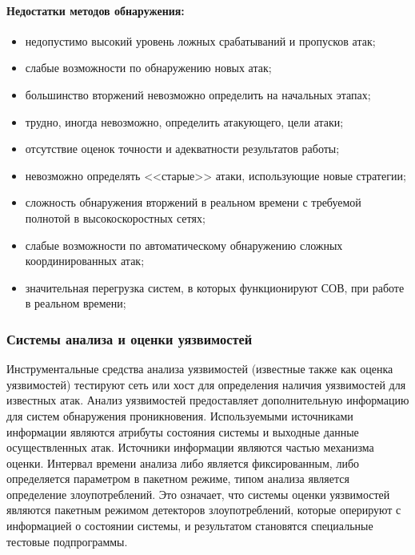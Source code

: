 \paragraph*{Недостатки методов обнаружения:}

\begin{itemize}
	\item недопустимо высокий уровень ложных срабатываний и пропусков атак;
	\item слабые возможности по обнаружению новых атак;
	\item большинство вторжений невозможно определить на начальных этапах;
	\item трудно, иногда невозможно, определить атакующего, цели атаки;
	\item отсутствие оценок точности и адекватности результатов работы;
	\item невозможно определять <<старые>> атаки, использующие новые стратегии;
	\item сложность обнаружения вторжений в реальном времени с требуемой полнотой в высокоскоростных сетях;
	\item слабые возможности по автоматическому обнаружению сложных координированных атак;
	\item значительная перегрузка систем, в которых функционируют СОВ, при работе в реальном времени;
	
\end{itemize}



\subsubsection{Системы анализа и оценки уязвимостей}


Инструментальные средства анализа уязвимостей (известные также как оценка уязвимостей) тестируют сеть или хост для определения наличия уязвимостей для известных атак. Анализ уязвимостей предоставляет дополнительную информацию для систем обнаружения проникновения. Используемыми источниками информации являются атрибуты состояния системы и выходные данные осуществленных атак. Источники информации являются частью механизма оценки. Интервал времени анализа либо является фиксированным, либо определяется параметром в пакетном режиме, типом анализа является определение злоупотреблений. Это означает, что системы оценки уязвимостей являются пакетным режимом детекторов злоупотреблений, которые оперируют с информацией о состоянии системы, и результатом становятся специальные тестовые подпрограммы. \autocite{IntrusionDetectionSystemsMsu}

